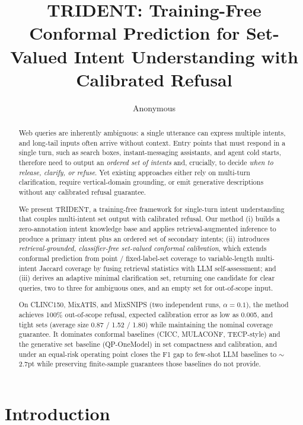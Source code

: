 \documentclass[sigconf, anonymous, review]{acmart}
\begin{document}
\title{TRIDENT: Training-Free Conformal Prediction for Set-Valued Intent Understanding with Calibrated Refusal}
\author{Anonymous}

\begin{abstract}
Web queries are inherently ambiguous: a single utterance can express multiple intents, and long-tail inputs often arrive without context. Entry points that must respond in a single turn, such as search boxes, instant-messaging assistants, and agent cold starts, therefore need to output an \textit{ordered set of intents} and, crucially, to decide \textit{when to release, clarify, or refuse}. Yet existing approaches either rely on multi-turn clarification, require vertical-domain grounding, or emit generative descriptions without any calibrated refusal guarantee.

We present TRIDENT, a training-free framework for single-turn intent understanding that couples multi-intent set output with calibrated refusal. Our method (i) builds a zero-annotation intent knowledge base and applies retrieval-augmented inference to produce a primary intent plus an ordered set of secondary intents; (ii) introduces \emph{retrieval-grounded, classifier-free set-valued conformal calibration}, which extends conformal prediction from point / fixed-label-set coverage to variable-length multi-intent Jaccard coverage by fusing retrieval statistics with LLM self-assessment; and (iii) derives an adaptive minimal clarification set, returning one candidate for clear queries, two to three for ambiguous ones, and an empty set for out-of-scope input.

On CLINC150, MixATIS, and MixSNIPS (two independent runs, $\alpha=0.1$), the method achieves 100\% out-of-scope refusal, expected calibration error as low as 0.005, and tight sets (average size 0.87 / 1.52 / 1.80) while maintaining the nominal coverage guarantee. It dominates conformal baselines (CICC, MULACONF, TECP-style) and the generative set baseline (QP-OneModel) in set compactness and calibration, and under an equal-risk operating point closes the F1 gap to few-shot LLM baselines to $\sim$2.7pt while preserving finite-sample guarantees those baselines do not provide.
\end{abstract}

\maketitle

\section{Introduction}
\end{document}
